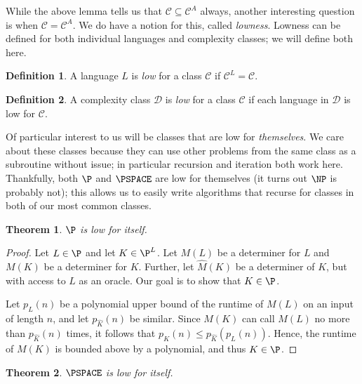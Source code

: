 \documentclass[english,12pt]{reedthesis}
\theoremstyle{plain}
\newtheorem{thm}{Theorem}[section]
\theoremstyle{definition}
\newtheorem{defn}[defn]{Definition}
\theoremstyle{remark}
\begin{document}
While the above lemma tells us that $\mathcal{C} \subseteq \mathcal{C}^{A}$ always, another interesting
question is when $\mathcal{C} = \mathcal{C}^{A}$. We do have a notion for this, called
\emph{lowness}. Lowness can be defined for both individual languages and
complexity classes; we will define both here.

\begin{defn}\label{def:low-class}
  A language $L$ is \emph{low} for a class $\mathcal{C}$ if $\mathcal{C}^{L} = \mathcal{C}$.
\end{defn}

\begin{defn}\label{def:low-lang}
  A complexity class $\mathcal{D}$ is \emph{low} for a class $\mathcal{C}$ if each language in $\mathcal{D}$
  is low for $\mathcal{C}$.
\end{defn}

Of particular interest to us will be classes that are low for \emph{themselves}.
We care about these classes because they can use other problems from the same
class as a subroutine without issue; in particular recursion and iteration both
work here. Thankfully, both $\P$ and $\PSPACE$ are low for themselves (it turns
out $\NP$ is probably not); this allows us to easily write algorithms that
recurse for classes in both of our most common classes.

\begin{thm}\label{thm:p-low}
  $\P$ is low for itself.
\end{thm}

\begin{proof}
  Let $L \in \P$ and let $K \in \P^{L}$. Let $M(L)$ be a determiner for $L$ and
  $M(K)$ be a determiner for $K$. Further, let $\hat{M}(K)$ be a determiner of
  $K$, but with access to $L$ as an oracle. Our goal is to show that $K \in \P$.

  Let $p_{L}(n)$ be a polynomial upper bound of the runtime of $M(L)$ on an
  input of length $n$, and let $p_{\hat{K}}(n)$ be similar. Since $M(K)$ can
  call $M(L)$ no more than $p_{\hat{K}}(n)$ times, it follows that
  $p_{K}(n) \le p_{\hat{K}}(p_{L}(n))$. Hence, the runtime of $M(K)$ is bounded
  above by a polynomial, and thus $K \in \P$.
\end{proof}

\begin{thm}\label{thm:pspace-low}
  $\PSPACE$ is low for itself.
\end{thm}
\end{document}
